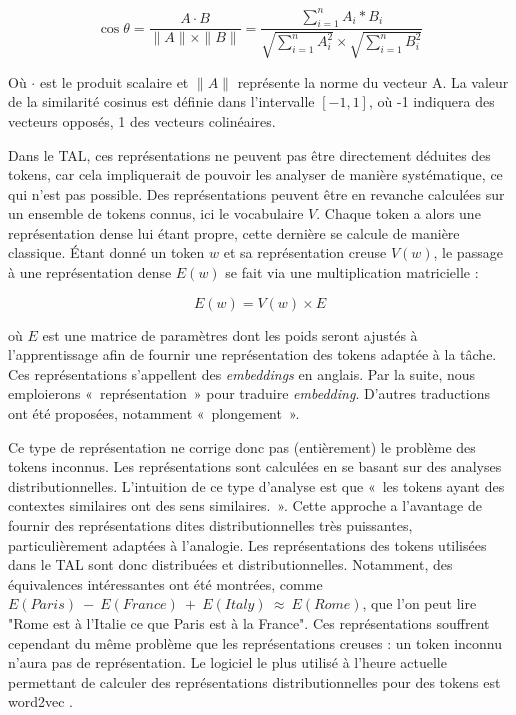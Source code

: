 \documentclass[12pt,a4paper,times,twoside,openright]{report}
\begin{document}
\begin{equation}\label{eq:cosine-similarity}
\cos \theta = \frac{A \cdot B}{\|A\| \times \|B\|} = \frac{\sum_{i=1}^{n}A_{i} * B_{i}}{\sqrt{\sum_{i=1}^{n}A_{i}^{2}} \times \sqrt{\sum_{i=1}^{n}B_{i}^{2}}}
\end{equation}

Où $\cdot$ est le produit scalaire et $\|A\|$ représente la norme du vecteur A. La valeur de la similarité cosinus est définie dans l'intervalle $[-1,1]$, où -1 indiquera des vecteurs opposés, 1 des vecteurs colinéaires.

Dans le TAL, ces représentations ne peuvent pas être directement déduites des tokens, car cela impliquerait de pouvoir les analyser de manière systématique, ce qui n'est pas possible. Des représentations peuvent être en revanche calculées sur un ensemble de tokens connus, ici le vocabulaire $V$. Chaque token a alors une représentation dense lui étant propre, cette dernière se calcule de manière classique. Étant donné un token $w$ et sa représentation creuse $V(w)$, le passage à une représentation dense $E(w)$ se fait via une multiplication matricielle :

\begin{equation}\label{eq:sparse-to-dense}
E(w) = V(w) \times E
\end{equation}

où $E$ est une matrice de paramètres dont les poids seront ajustés à l'apprentissage afin de fournir une représentation des tokens adaptée à la tâche. Ces représentations s'appellent des \textit{embeddings} en anglais. Par la suite, nous emploierons «\ représentation\ » pour traduire \textit{embedding}. D'autres traductions ont été proposées, notamment «\ plongement\ ».

Ce type de représentation ne corrige donc pas (entièrement) le problème des tokens inconnus. Les représentations sont calculées en se basant sur des analyses distributionnelles. L'intuition de ce type d'analyse est que «\ les tokens ayant des contextes similaires ont des sens similaires.\ ». Cette approche a l'avantage de fournir des représentations dites distributionnelles très puissantes, particulièrement adaptées à l'analogie. Les représentations des tokens utilisées dans le TAL sont donc distribuées et distributionnelles. Notamment, des équivalences intéressantes ont été montrées, comme $E(Paris)\ -\ E(France)\ +\ E(Italy)\ \approx\ E(Rome)$, que l'on peut lire "Rome est à l'Italie ce que Paris est à la France". Ces représentations souffrent cependant du même problème que les représentations creuses : un token inconnu n'aura pas de représentation. Le logiciel le plus utilisé à l'heure actuelle permettant de calculer des représentations distributionnelles pour des tokens est word2vec \citep{mikolov2013efficient,mikolov2013distributed}.
\end{document}
